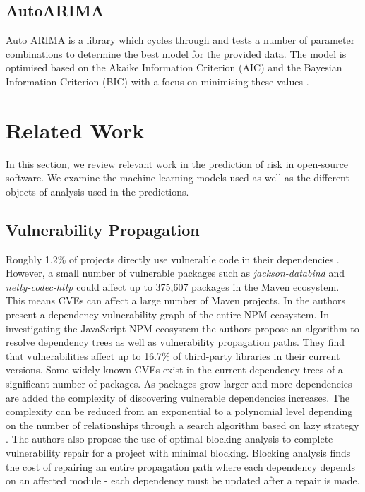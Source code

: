 \documentclass[conference]{IEEEtran}
\begin{document}
\subsection{AutoARIMA}  
Auto ARIMA is a library which cycles through and tests a number of parameter combinations to determine the best model for the provided data. The model is optimised based on the Akaike Information Criterion (AIC) and the Bayesian Information Criterion (BIC) with a focus on minimising these values \cite{noauthor_pmdarima_nodate}.

\section{Related Work}
In this section, we review relevant work in the prediction of risk in open-source software. We examine the machine learning models used as well as the different objects of analysis used in the predictions.  

\subsection{Vulnerability Propagation}
Roughly 1.2\% of projects directly use vulnerable code in their dependencies \cite{a_m_mir_effect_2023}. However, a small number of vulnerable packages such as \textit{jackson-databind} and \textit{netty-codec-http} could affect up to 375,607 packages in the Maven ecosystem. This means CVEs can affect a large number of Maven projects. In \cite{c_liu_demystifying_2022} the authors present a dependency vulnerability graph of the entire NPM ecosystem. In investigating the JavaScript NPM ecosystem the authors propose an algorithm to resolve dependency trees as well as vulnerability propagation paths. They find that vulnerabilities affect up to 16.7\% of third-party libraries in their current versions. Some widely known CVEs exist in the current dependency trees of a significant number of packages. As packages grow larger and more dependencies are added the complexity of discovering vulnerable dependencies increases. The complexity can be reduced from an exponential to a polynomial level depending on the number of relationships through a search algorithm based on lazy strategy \cite{w_hu_open_2019}. The authors also propose the use of optimal blocking analysis to complete vulnerability repair for a project with minimal blocking. Blocking analysis finds the cost of repairing an entire propagation path where each dependency depends on an affected module - each dependency must be updated after a repair is made. 
\end{document}
